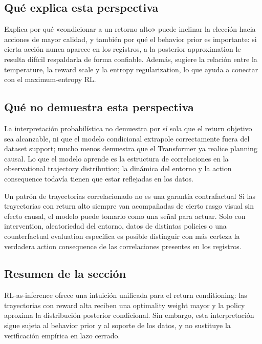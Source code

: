 \subsection{Qué explica esta perspectiva}

Explica por qué «condicionar a un retorno alto» puede inclinar la elección hacia acciones de mayor calidad, y también por qué el behavior prior es importante: si cierta acción nunca aparece en los registros, a la posterior approximation le resulta difícil respaldarla de forma confiable. Además, sugiere la relación entre la temperature, la reward scale y la entropy regularization, lo que ayuda a conectar con el maximum-entropy RL.

\subsection{Qué no demuestra esta perspectiva}

La interpretación probabilística no demuestra por sí sola que el return objetivo sea alcanzable, ni que el modelo condicional extrapole correctamente fuera del dataset support; mucho menos demuestra que el Transformer ya realice planning causal. Lo que el modelo aprende es la estructura de correlaciones en la observational trajectory distribution; la dinámica del entorno y la action consequence todavía tienen que estar reflejadas en los datos.

\begin{warningbox}{Un patrón de trayectorias correlacionado no es una garantía contrafactual}
Si las trayectorias con return alto siempre van acompañadas de cierto rasgo visual sin efecto causal, el modelo puede tomarlo como una señal para actuar. Solo con intervention, aleatoriedad del entorno, datos de distintas policies o una counterfactual evaluation específica es posible distinguir con más certeza la verdadera action consequence de las correlaciones presentes en los registros.
\end{warningbox}

\subsection{Resumen de la sección}

RL-as-inference ofrece una intuición unificada para el return conditioning: las trayectorias con reward alta reciben una optimality weight mayor y la policy aproxima la distribución posterior condicional. Sin embargo, esta interpretación sigue sujeta al behavior prior y al soporte de los datos, y no sustituye la verificación empírica en lazo cerrado.
